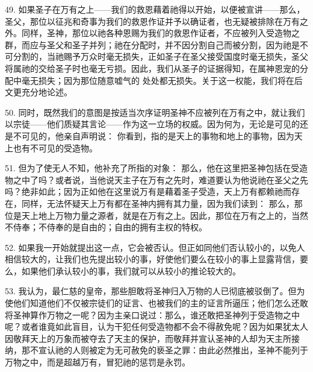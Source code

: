 49. 如果圣子在万有之上——我们的救恩藉着祂得以开始，以便被宣讲——那么，圣父，那位以征兆和奇事为我们的救恩作证并予以确证者，也无疑被排除在万有之外。同样，圣神，那位以祂各种恩赐为我们的救恩作证者，不应被列入受造物之群，而应与圣父和圣子并列；祂在分配时，并不因分割自己而被分割，因为祂是不可分割的，当祂赐予万众时毫无损失，正如圣子在圣父接受国度时毫无损失，圣父将属祂的交给圣子时也毫无亏损。因此，我们从圣子的证据得知，在属神恩宠的分配中毫无损失；因为那位随意嘘气的 处处都无损失。关于这一权能，我们将在后文更充分地论述。\par

50. 同时，既然我们的意图是按适当次序证明圣神不应被列在万有之中，就让我们以宗徒——他们质疑其言论——作为这一立场的权威。因为何为，无论是可见的还是不可见的，他亲自声明说： 你看到，指的是天上的事物和地上的事物，因为天上也有不可见的受造物。\par

51. 但为了使无人不知，他补充了所指的对象： 那么，他在这里把圣神包括在受造物之中了吗？或者说，当他说天主子在万有之先时，难道要认为他说祂在圣父之先吗？绝非如此；因为正如他在这里说万有是藉着圣子受造，天上万有都赖祂而存在，同样，无法怀疑天上万有都在圣神内拥有其力量，因为我们读到： 那么，那位是天上地上万物力量之源者，就是在万有之上。因此，那位在万有之上的，当然不侍奉；不侍奉的是自由的；自由的拥有主权的特权。\par

52. 如果我一开始就提出这一点，它会被否认。但正如同他们否认较小的，以免人相信较大的，让我们也先提出较小的事，好使他们要么在较小的事上显露背信，要么，如果他们承认较小的事，我们就可以从较小的推论较大的。\par

53. 我认为，最仁慈的皇帝，那些胆敢将圣神归入万物的人已彻底被驳倒了。但为使他们知道他们不仅被宗徒们的证言、也被我们的主的证言所逼压；他们怎么还敢将圣神算作万物之一呢？因为主亲口说过：那么，谁还敢把圣神列于受造物之中呢？或者谁竟如此盲目，认为干犯任何受造物都不会不得赦免呢？因为如果犹太人因敬拜天上的万象而被夺去了天主的保护，而敬拜并宣认圣神的人却为天主所接纳，那不宣认祂的人则被定为无可赦免的亵圣之罪：由此必然推出，圣神不能列于万物之中，而是超越万有，冒犯祂的惩罚是永罚。\par

